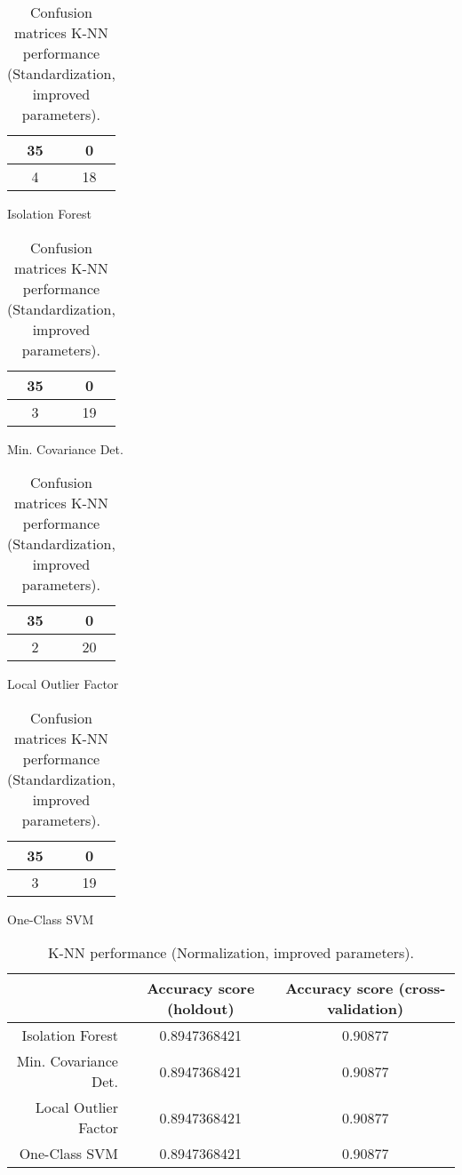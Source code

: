 \documentclass{article}
\begin{document}
\begin{table}[h]
\begin{subtable}[h]{0.2\textwidth}
\centering
\begin{tabular}{c|c}
35 & 0 \\
\hline
4 & 18 \\
\end{tabular}
\caption{Isolation Forest}
\end{subtable}
\hfill
\begin{subtable}[h]{0.2\textwidth}
\centering
\begin{tabular}{c|c}
35 & 0 \\
\hline
3 & 19 \\
\end{tabular}
\caption{Min. Covariance Det.}
\end{subtable}
\hfill
\begin{subtable}[h]{0.2\textwidth}
\centering
\begin{tabular}{c|c}
35 & 0 \\
\hline
2 & 20 \\
\end{tabular}
\caption{Local Outlier Factor}
\end{subtable}
\hfill
\begin{subtable}[h]{0.2\textwidth}
\centering
\begin{tabular}{c|c}
35 & 0 \\
\hline
3 & 19 \\
\end{tabular}
\caption{One-Class SVM}
\end{subtable}
\caption{Confusion matrices K-NN performance (Standardization, improved parameters).}
\end{table}

\begin{table}[h]
\begin{center}
\begin{tabular}{r|c|c}
& Accuracy score (holdout) & Accuracy score (cross-validation) \\
\hline
Isolation Forest	& 0.8947368421 & 0.90877 \\
Min. Covariance Det. & 0.8947368421 & 0.90877 \\
Local Outlier Factor	& 0.8947368421 & 0.90877 \\
One-Class SVM & 0.8947368421 & 0.90877 \\
\end{tabular}
\caption{K-NN performance (Normalization, improved parameters).}
\end{center}
\end{table}
\end{document}
